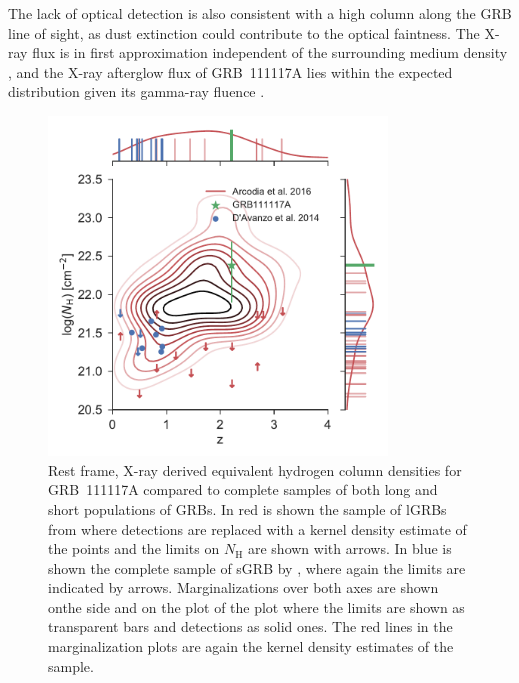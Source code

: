 \documentclass{aa}    %
\begin{document}
The lack of optical detection is also consistent with a high column along the
GRB line of sight, as dust extinction could contribute to the optical faintness.
The X-ray flux is in first approximation independent of the surrounding medium
density \citep{Berger2003, Nysewander2009}, and the X-ray afterglow flux of
GRB~111117A lies within the expected distribution given its gamma-ray fluence
\citep{DAvanzo2014a}.


\begin{figure}
	\centering
	\includegraphics[width=9cm]{figures/NH_z.pdf}
	\caption{Rest frame, X-ray derived equivalent hydrogen column densities for GRB~111117A compared to complete samples of both long and short populations of GRBs. In red is shown the sample of lGRBs from \citet{Arcodia2016} where detections are replaced with a kernel density estimate of the points and the limits on $N_\mathrm{H}$ are shown with arrows. In blue is shown the complete sample of sGRB by \citet{DAvanzo2014a}, where again the limits are indicated by arrows. Marginalizations over both axes are shown onthe side and on the plot of the plot where the limits are shown as transparent bars and detections as solid ones. The red lines in the marginalization plots are again the kernel density estimates of the \citet{Arcodia2016} sample.}
	\label{fig:NH_z}
\end{figure}

\end{document}
